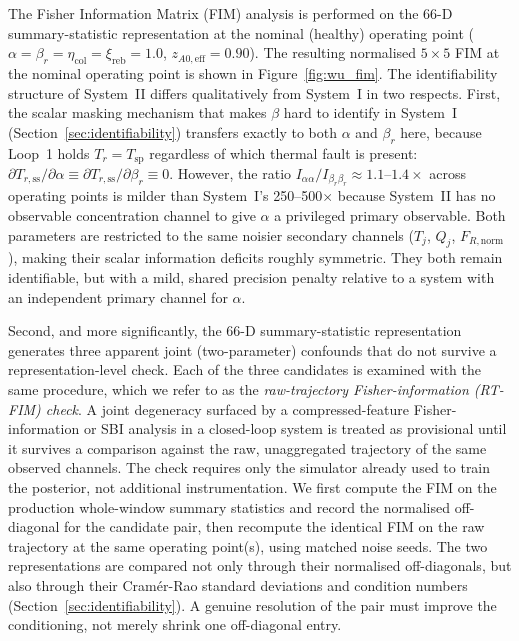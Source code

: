 \documentclass[aps,pre,twocolumn,superscriptaddress]{revtex4-2}
\begin{document}
The Fisher Information Matrix (FIM) analysis is performed on the 66-D summary-statistic representation
at the nominal (healthy) operating point ($\alpha = \beta_r = \eta_\mathrm{col}
= \xi_\mathrm{reb} = 1.0$, $z_{A0,\mathrm{eff}} = 0.90$). The resulting normalised $5\times5$ FIM at the nominal operating point is shown in Figure~\ref{fig:wu_fim}. The identifiability
structure of System~II differs qualitatively from System~I in two respects.
First, the scalar masking mechanism that makes $\beta$ hard to identify in
System~I (Section~\ref{sec:identifiability}) transfers exactly to both
$\alpha$ and $\beta_r$ here, because Loop~1 holds $T_r = T_\mathrm{sp}$
regardless of which thermal fault is present:
$\partial T_{r,\mathrm{ss}}/\partial\alpha \equiv \partial T_{r,\mathrm{ss}}/\partial\beta_r \equiv 0$.
However, the ratio $I_{\alpha\alpha}/I_{\beta_r\beta_r} \approx 1.1$--$1.4\times$
across operating points is milder than System~I's 250--500$\times$ because
System~II has no observable concentration channel to give $\alpha$ a privileged
primary observable. Both parameters are restricted to the same noisier
secondary channels ($T_j$, $Q_j$, $F_{R,\mathrm{norm}}$), making their scalar
information deficits roughly symmetric. They both remain identifiable, but with a
mild, shared precision penalty relative to a system with an independent
primary channel for $\alpha$.

Second, and more significantly, the 66-D summary-statistic representation
generates three apparent joint (two-parameter) confounds that do not survive
a representation-level check.  
Each of the three candidates is examined with the same procedure, which
we refer to as the \emph{raw-trajectory Fisher-information (RT-FIM) check}. A
joint degeneracy surfaced by a compressed-feature Fisher-information or SBI
analysis in a closed-loop system is treated as provisional until it survives a
comparison against the raw, unaggregated trajectory of the same observed
channels. The check requires only the simulator already used to train the
posterior, not additional instrumentation. We first compute the FIM on the
production whole-window summary statistics and record the normalised
off-diagonal for the candidate pair, then recompute the identical FIM on the
raw trajectory at the same operating point(s), using matched noise seeds. The
two representations are compared not only through their normalised
off-diagonals, but also through their Cram\'er-Rao standard deviations and
condition numbers (Section~\ref{sec:identifiability}). A genuine resolution of
the pair must improve the conditioning, not merely shrink one off-diagonal
entry.
\end{document}

